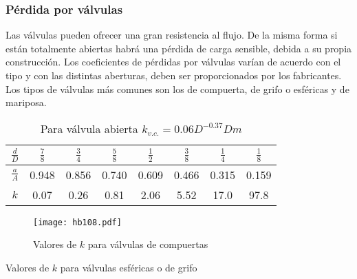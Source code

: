 \subsubsection{Pérdida por válvulas}
Las válvulas pueden ofrecer una gran resistencia al flujo. De la misma forma si están totalmente abiertas habrá una pérdida de carga sensible, debida a su propia construcción. Los coeficientes de pérdidas por válvulas varían de acuerdo con el tipo y con las distintas aberturas, deben ser proporcionados por los fabricantes. Los tipos de válvulas más comunes son los de compuerta, de grifo o esféricas y de mariposa.
\begin{table}[h!]
    \centering
    \begin{tabular}{@{}cccccccc@{}}
    \toprule
    $\frac{d}{D}$ & $\frac{7}{8}$ & $\frac{3}{4}$ & $\frac{5}{8}$ & $\frac{1}{2}$ & $\frac{3}{8}$ & $\frac{1}{4}$ & $\frac{1}{8}$ \\ \midrule
    $\frac{a}{A}$ & 0.948         & 0.856         & 0.740         & 0.609         & 0.466         & 0.315         & 0.159         \\
    $k$           & 0.07          & 0.26          & 0.81          & 2.06          & 5.52          & 17.0          & 97.8          \\ \bottomrule
    \end{tabular}
    \caption{Para válvula abierta $k_{v.c.}=0.06D^{-0.37}Dm$}
    \label{tabhb21}
    \end{table}
    \begin{wrapfigure}{l}{0.25\textwidth}
\centering
  \texttt{[image: hb108.pdf]}
  \caption{Valores de $k$ para válvulas de compuertas}
  \label{hb108}
\end{wrapfigure}

Valores de $k$ para válvulas esféricas o de grifo

